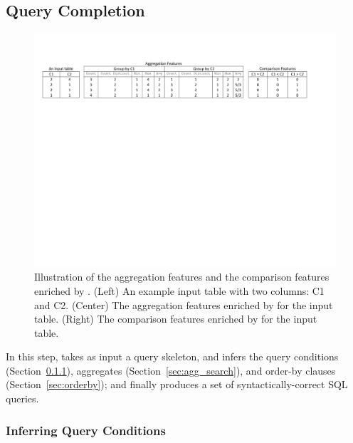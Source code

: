 \subsection{Query Completion}
\label{sec:completion}


\begin{figure}[t]
    \centering
    \includegraphics[scale=0.75]{featurex}
	\caption{Illustration of the aggregation features and the comparison
    features enriched by \ourtool. (Left) An example input table with
    two columns: C1 and C2. (Center) The aggregation features enriched by
    \ourtool for the input table. (Right) The comparison features
    enriched by \ourtool for the input table.
}
	\label{tbl:com}
\end{figure}

In this step, \ourtool takes as input a query skeleton, and
infers the query conditions (Section~\ref{sec:condition}),
aggregates (Section~\ref{sec:agg_search}), and order-by clauses (Section~\ref{sec:orderby}); and finally
produces a set of syntactically-correct SQL queries.


\subsubsection{Inferring Query Conditions}
\label{sec:condition}


